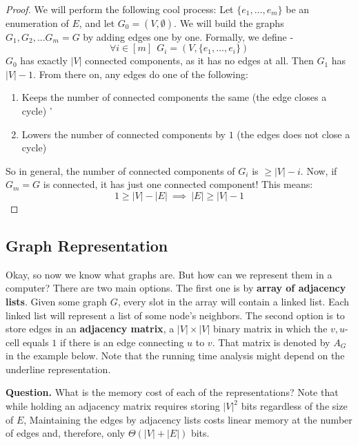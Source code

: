 \begin{proof}
We will perform the following cool process: Let $\{e_1,...,e_m\}$ be an enumeration of $E$, and let $G_0=(V,\emptyset)$. We will build the graphs $G_1, G_2,... G_m=G$ by adding edges one by one. Formally, we define - 
$$\forall i\in[m]\ \ G_i=(V,\{e_1,...,e_i\})$$
$G_0$ has exactly $|V|$ connected components, as it has no edges at all. Then $G_1$ has $|V|-1$. From there on, any edges do one of the following:
\begin{enumerate}
    \item Keeps the number of connected components the same (the edge closes a cycle)
    '\item Lowers the number of connected components by $1$ (the edges does not close a cycle)
\end{enumerate}

So in general, the number of connected components of $G_i$ is $\geq |V|-i$. 
Now, if $G_m=G$ is connected, it has just one connected component! This means:
$$1 \geq |V| - |E|\ \implies \ |E|\geq|V|-1$$

\end{proof}


\subsection{Graph Representation}

Okay, so now we know what graphs are. But how can we represent them in a computer? There are two main options. The first one is by \textbf{array of adjacency lists}. Given some graph $G$, every slot in the array will contain a linked list. Each linked list will represent a list of some node's neighbors. The second option is to store edges in an \textbf{adjacency matrix}, a $ |V| \times |V| $ binary matrix in which the $v,u$-cell equals $1$ if there is an edge connecting $u$ to $v$. That matrix is denoted by $A_{G}$ in the example below. Note that the running time analysis might depend on the underline representation.     

\textbf{Question.} What is the memory cost of each of the representations? Note that while holding an adjacency matrix requires storing $|V|^2$ bits regardless of the size of $E$, Maintaining the edges by adjacency lists costs linear memory at the number of edges and, therefore, only $ \Theta \left(  |V| + |E| \right) $ bits. 

